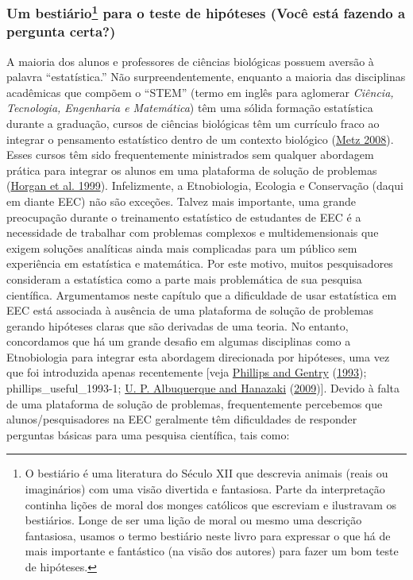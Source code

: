 \documentclass[
]{article}
\begin{document}
\hypertarget{um-bestiuxe1rio1-para-o-teste-de-hipuxf3teses-vocuxea-estuxe1-fazendo-a-pergunta-certa}{%
\subsubsection[Um bestiário para o teste de hipóteses (Você está fazendo a pergunta certa?)]{\texorpdfstring{Um bestiário\footnote{O bestiário é uma literatura do Século XII que descrevia animais (reais ou imaginários) com uma visão divertida e fantasiosa. Parte da interpretação continha lições de moral dos monges católicos que escreviam e ilustravam os bestiários. Longe de ser uma lição de moral ou mesmo uma descrição fantasiosa, usamos o termo bestiário neste livro para expressar o que há de mais importante e fantástico (na visão dos autores) para fazer um bom teste de hipóteses.} para o teste de hipóteses (Você está fazendo a pergunta certa?)}{Um bestiário para o teste de hipóteses (Você está fazendo a pergunta certa?)}}\label{um-bestiuxe1rio1-para-o-teste-de-hipuxf3teses-vocuxea-estuxe1-fazendo-a-pergunta-certa}}

A maioria dos alunos e professores de ciências biológicas possuem aversão à palavra ``estatística.'' Não surpreendentemente, enquanto a maioria das disciplinas acadêmicas que compõem o ``STEM'' (termo em inglês para aglomerar \emph{Ciência, Tecnologia, Engenharia e Matemática}) têm uma sólida formação estatística durante a graduação, cursos de ciências biológicas têm um currículo fraco ao integrar o pensamento estatístico dentro de um contexto biológico (\protect\hyperlink{ref-metz_teaching_2008}{Metz 2008}). Esses cursos têm sido frequentemente ministrados sem qualquer abordagem prática para integrar os alunos em uma plataforma de solução de problemas (\protect\hyperlink{ref-horgan_teaching_1999}{Horgan et al. 1999}). Infelizmente, a Etnobiologia, Ecologia e Conservação (daqui em diante EEC) não são exceções. Talvez mais importante, uma grande preocupação durante o treinamento estatístico de estudantes de EEC é a necessidade de trabalhar com problemas complexos e multidemensionais que exigem soluções analíticas ainda mais complicadas para um público sem experiência em estatística e matemática. Por este motivo, muitos pesquisadores consideram a estatística como a parte mais problemática de sua pesquisa científica. Argumentamos neste capítulo que a dificuldade de usar estatística em EEC está associada à ausência de uma plataforma de solução de problemas gerando hipóteses claras que são derivadas de uma teoria. No entanto, concordamos que há um grande desafio em algumas disciplinas como a Etnobiologia para integrar esta abordagem direcionada por hipóteses, uma vez que foi introduzida apenas recentemente {[}veja \protect\hyperlink{ref-phillips_useful_1993}{Phillips and Gentry} (\protect\hyperlink{ref-phillips_useful_1993}{1993}); phillips\_useful\_1993-1; \protect\hyperlink{ref-albuquerque_five_2009}{U. P. Albuquerque and Hanazaki} (\protect\hyperlink{ref-albuquerque_five_2009}{2009}){]}. Devido à falta de uma plataforma de solução de problemas, frequentemente percebemos que alunos/pesquisadores na EEC geralmente têm dificuldades de responder
perguntas básicas para uma pesquisa científica, tais como:
\end{document}
